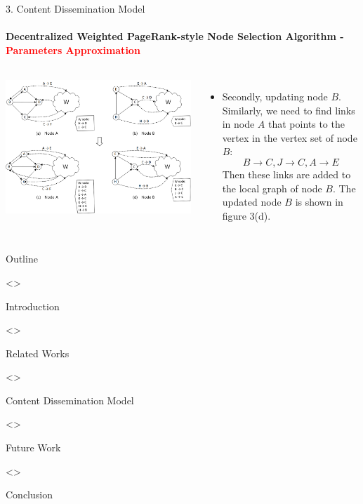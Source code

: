 \documentclass{beamer}		%
\begin{document}
\begin{frame}{3. Content Dissemination Model}
\framesubtitle{Decentralized Weighted PageRank-style Node Selection Algorithm - \textcolor{red}{Parameters Approximation}}
\begin{columns}
\includegraphics[scale=0.048]{imgs/Fig3.png}
\begin{itemize}
   \item Secondly, updating node $B$. Similarly, we need to find links in node $A$ that points to the vertex in the vertex set of node $B$: \[{B\rightarrow C,J\rightarrow C,A\rightarrow E}\] Then these links are added to the local graph of node $B$. The updated node $B$ is shown in figure 3(d).
\end{itemize}
\end{columns}
\end{frame}



\begin{frame}{Outline}
\begin{enumerate}[1. ]
\uncover<>{\item Introduction}
\uncover<>{\item Related Works}
\uncover<>{\item Content Dissemination Model}
\uncover<>{\item Future Work}
\uncover<>{\item Conclusion}
\end{enumerate}
\end{frame}
\end{document}
